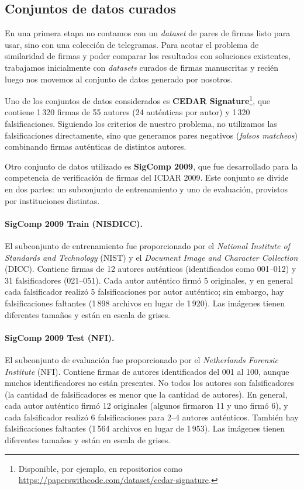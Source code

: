 \subsection{Conjuntos de datos curados}

En una primera etapa no contamos con un \textit{dataset} de pares de firmas listo para usar, sino con una colección de telegramas. Para acotar el problema de similaridad de firmas y poder comparar los resultados con soluciones existentes, trabajamos inicialmente con \textit{datasets} curados de firmas manuscritas y recién luego nos movemos al conjunto de datos generado por nosotros.

Uno de los conjuntos de datos considerados es \textbf{CEDAR Signature}\footnote{Disponible, por ejemplo, en repositorios como \url{https://paperswithcode.com/dataset/cedar-signature}.}, que contiene 1\,320 firmas de 55 autores (24 auténticas por autor) y 1\,320 falsificaciones. Siguiendo los criterios de nuestro problema, no utilizamos las falsificaciones directamente, sino que generamos pares negativos (\textit{falsos matcheos}) combinando firmas auténticas de distintos autores.

Otro conjunto de datos utilizado es \textbf{SigComp 2009}, que fue desarrollado para la competencia de verificación de firmas del ICDAR 2009. Este conjunto se divide en dos partes: un subconjunto de entrenamiento y uno de evaluación, provistos por instituciones distintas.

\paragraph{SigComp 2009 Train (NISDICC).} El subconjunto de entrenamiento fue proporcionado por el \textit{National Institute of Standards and Technology} (NIST) y el \textit{Document Image and Character Collection} (DICC). Contiene firmas de 12 autores auténticos (identificados como 001--012) y 31 falsificadores (021--051). Cada autor auténtico firmó 5 originales, y en general cada falsificador realizó 5 falsificaciones por autor auténtico; sin embargo, hay falsificaciones faltantes (1\,898 archivos en lugar de 1\,920). Las imágenes tienen diferentes tamaños y están en escala de grises.

\paragraph{SigComp 2009 Test (NFI).} El subconjunto de evaluación fue proporcionado por el \textit{Netherlands Forensic Institute} (NFI). Contiene firmas de autores identificados del 001 al 100, aunque muchos identificadores no están presentes. No todos los autores son falsificadores (la cantidad de falsificadores es menor que la cantidad de autores). En general, cada autor auténtico firmó 12 originales (algunos firmaron 11 y uno firmó 6), y cada falsificador realizó 6 falsificaciones para 2--4 autores auténticos. También hay falsificaciones faltantes (1\,564 archivos en lugar de 1\,953). Las imágenes tienen diferentes tamaños y están en escala de grises.

